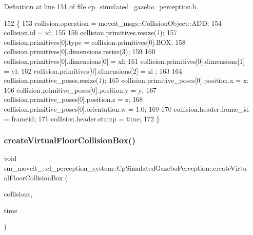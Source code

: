 Definition at line 151 of file cp\+\_\+simulated\+\_\+gazebo\+\_\+perception.\+h.


\begin{DoxyCode}
152             \{
153                 collision.operation = moveit\_msgs::CollisionObject::ADD;
154                 collision.id = id;
155 
156                 collision.primitives.resize(1);
157                 collision.primitives[0].type = collision.primitives[0].BOX;
158                 collision.primitives[0].dimensions.resize(3);
159 
160                 collision.primitives[0].dimensions[0] = xl;
161                 collision.primitives[0].dimensions[1] = yl;
162                 collision.primitives[0].dimensions[2] = zl ;
163 
164                 collision.primitive\_poses.resize(1);
165                 collision.primitive\_poses[0].position.x = x;
166                 collision.primitive\_poses[0].position.y = y;
167                 collision.primitive\_poses[0].position.z = z;
168                 collision.primitive\_poses[0].orientation.w = 1.0;
169 
170                 collision.header.frame\_id = frameid;
171                 collision.header.stamp = time;
172             \}
\end{DoxyCode}
\mbox{\label{classsm__moveit__4_1_1cl__perception__system_1_1CpSimulatedGazeboPerception_a668b93281f2ab325c790e20f452f3f8f}} 
\subsubsection{\texorpdfstring{create\+Virtual\+Floor\+Collision\+Box()}{createVirtualFloorCollisionBox()}}
{\footnotesize\ttfamily void sm\+\_\+moveit\+\_\+::cl\+\_\+perception\+\_\+system\+::\+Cp\+Simulated\+Gazebo\+Perception\+::create\+Virtual\+Floor\+Collision\+Box (\begin{DoxyParamCaption}\item[{std\+::vector$<$ moveit\+\_\+msgs\+::\+Collision\+Object $>$ \&}]{collisions,  }\item[{ros\+::\+Time}]{time }\end{DoxyParamCaption})\hspace{0.3cm}{\ttfamily [inline]}}



